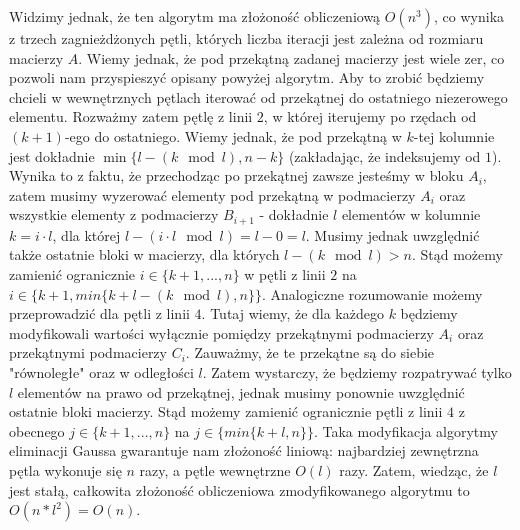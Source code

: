 \documentclass[11pt]{article}
\begin{document}
        \noindent
        Widzimy jednak, że ten algorytm ma złożoność obliczeniową $O(n^3)$, co wynika z trzech zagnieżdżonych pętli, których liczba iteracji jest zależna od rozmiaru macierzy $A$. Wiemy jednak, że pod przekątną zadanej macierzy jest wiele zer, co pozwoli nam przyspieszyć opisany powyżej algorytm. Aby to zrobić będziemy chcieli w wewnętrznych pętlach iterować od przekątnej do ostatniego niezerowego elementu.
        \newline\newline
        Rozważmy zatem pętlę z linii $2$, w której iterujemy po rzędach od $(k + 1)$-ego do ostatniego.
        Wiemy jednak, że pod przekątną w $k$-tej kolumnie jest dokładnie $\min\{l - (k \mod l), n - k\}$ (zakładając, że indeksujemy od $1$). Wynika to z faktu, że przechodząc po przekątnej zawsze jesteśmy w bloku $A_i$, zatem musimy wyzerować elementy pod przekątną w podmacierzy $A_i$ oraz wszystkie elementy z podmacierzy $B_{i + 1}$ - dokładnie $l$ elementów w kolumnie $k = i \cdot l$, dla której $l - (i \cdot l \mod l) = l - 0 = l$. Musimy jednak uwzględnić także ostatnie bloki w macierzy, dla których $l - (k \mod l) > n$. Stąd możemy zamienić ogranicznie $i \in \{k + 1, ..., n\}$ w pętli z linii $2$ na $i \in \{k + 1, min\{k + l - (k \mod l), n\}\}$.
        \newline\newline
        Analogiczne rozumowanie możemy przeprowadzić dla pętli z linii $4$. Tutaj wiemy, że dla każdego $k$ będziemy modyfikowali wartości wyłącznie pomiędzy przekątnymi podmacierzy $A_i$ oraz przekątnymi podmacierzy $C_i$. Zauważmy, że te przekątne są do siebie "równoległe" oraz w odległości $l$. Zatem wystarczy, że będziemy rozpatrywać tylko $l$ elementów na prawo od przekątnej, jednak musimy ponownie uwzględnić ostatnie bloki macierzy. Stąd możemy zamienić ogranicznie pętli z linii $4$ z obecnego $j \in \{k + 1, ..., n\}$ na $j \in \{min\{k + l, n\}\}$.
        \newline\newline
        Taka modyfikacja algorytmy eliminacji Gaussa gwarantuje nam złożoność liniową: najbardziej zewnętrzna pętla wykonuje się $n$ razy, a pętle wewnętrzne $O(l)$ razy. Zatem, wiedząc, że $l$ jest stałą, całkowita złożoność obliczeniowa zmodyfikowanego algorytmu to $O(n * l^2) = O(n)$.

        \newpage
\end{document}
